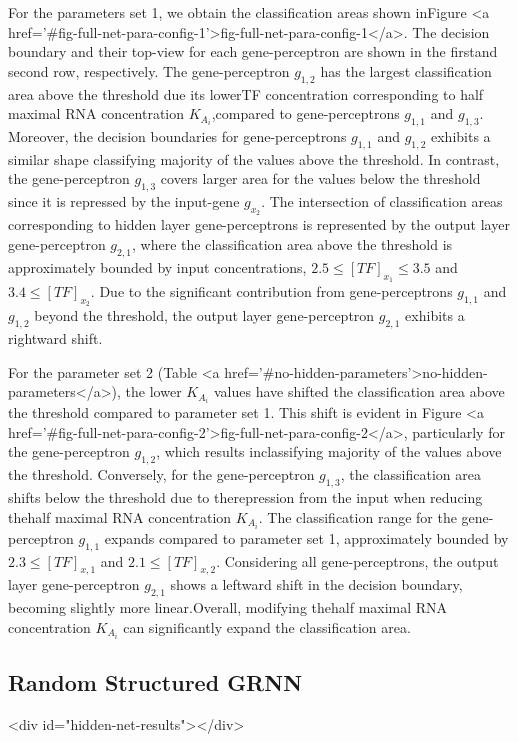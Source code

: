 \documentclass[twocolumn]{biophys-new}
\begin{document}
{{For the parameters set 1, we obtain the classification areas shown inFigure <a href='#fig-full-net-para-config-1'>fig-full-net-para-config-1</a>.
The decision boundary and their top-view for each gene-perceptron are shown in the firstand second row, respectively. 
The gene-perceptron $g_{1,2}$ has the largest classification area above the threshold due its lowerTF concentration corresponding to half maximal RNA concentration $K_{A_i}$,compared to
 gene-perceptrons $g_{1,1}$ and $g_{1,3}$. Moreover, the decision boundaries for gene-perceptrons $g_{1,1}$ and $g_{1,2}$ exhibits a similar shape classifying majority of the values above the threshold. In contrast, the gene-perceptron $g_{1,3}$ covers larger area for the values below the threshold since it is repressed by the input-gene $g_{x_2}$. The intersection of classification areas corresponding to hidden layer gene-perceptrons is represented by the output layer gene-perceptron $g_{2,1}$, where the classification area above the threshold is approximately bounded by input concentrations, $2.5 \leq [TF]_{x_1} \leq 3.5$ and $3.4 \leq [TF]_{x_2}$. Due to the significant contribution from gene-perceptrons $g_{1,1}$ and $g_{1,2}$ beyond the threshold, the output layer gene-perceptron $g_{2,1}$ exhibits a rightward shift. 

For the parameter set 2 (Table <a href='#no-hidden-parameters'>no-hidden-parameters</a>), the lower $K_{A_i}$ values have shifted the classification area above the threshold compared to parameter set 1. 
This shift is evident in Figure <a href='#fig-full-net-para-config-2'>fig-full-net-para-config-2</a>, particularly for the gene-perceptron $g_{1,2}$, which results inclassifying majority of the values above the threshold. Conversely, for the gene-perceptron $g_{1,3}$, the classification area shifts below the threshold due to therepression from the input when reducing thehalf maximal RNA concentration $K_{A_i}$. The classification range for the gene-perceptron $g_{1,1}$ expands compared to parameter set 1, approximately bounded by $2.3\leq [TF]_{x,1} $ and $2.1\leq [TF]_{x,2} $. Considering all gene-perceptrons, the output layer gene-perceptron $g_{2,1}$ shows a leftward shift in the decision boundary, becoming slightly more linear.Overall, modifying thehalf maximal RNA concentration $K_{A_i}$ can significantly expand the classification area. 
\subsection{Random Structured GRNN} <div id="hidden-net-results"></div>


}}
\end{document}
